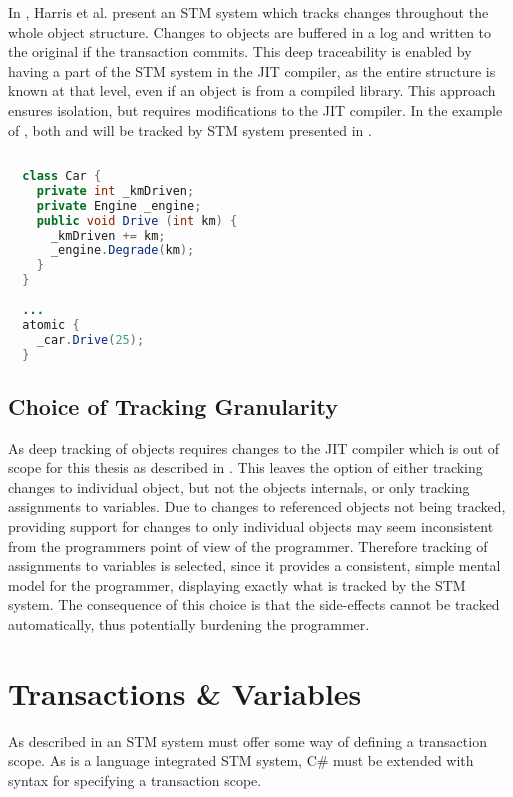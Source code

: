 In \cite{harris2003language}, Harris et al. present an \ac{STM} system which tracks changes throughout the whole object structure. Changes to objects are buffered in a log and written to the original if the transaction commits. This deep traceability is enabled by having a part of the \ac{STM} system in the \ac{JIT} compiler, as the entire structure is known at that level, even if an object is from a compiled library. This approach ensures isolation, but requires modifications to the \ac{JIT} compiler. In the example of , both  and  will be tracked by \ac{STM} system presented in \cite{harris2003language}.
%
\begin{lstlisting}[label=lst:tracking_object,
  float,
  caption={Tracking Changes to Object},
  language=Java,  
  showspaces=false,
  showtabs=false,
  breaklines=true,
  showstringspaces=false,
  breakatwhitespace=true,
  commentstyle=\color{greencomments},
  keywordstyle=\color{bluekeywords},
  stringstyle=\color{redstrings},
  morekeywords={atomic, retry, orElse, var, get, set}]  % Start your code-block
  
  class Car {
    private int _kmDriven;
    private Engine _engine;
    public void Drive (int km) { 
      _kmDriven += km; 
      _engine.Degrade(km);
    }
  }
  
  ...
  atomic {
    _car.Drive(25);
  }
\end{lstlisting}
%
\subsection{Choice of Tracking Granularity}
As deep tracking of objects requires changes to the \ac{JIT} compiler which is out of scope for this thesis as described in . This leaves the option of either tracking changes to individual object, but not the objects internals, or only tracking assignments to variables. Due to changes to referenced objects not being tracked, providing support for changes to only individual objects may seem inconsistent from the programmers point of view of the programmer. Therefore tracking of assignments to variables is selected, since it provides a consistent, simple mental model for the programmer, displaying exactly what is tracked by the \ac{STM} system. The consequence of this choice is that the side-effects cannot be tracked automatically, thus potentially burdening the programmer.

\section{Transactions \& Variables}
\label{subsec:rec_transactions_variables}
As described in  an \ac{STM} system must offer some way of defining a transaction scope. As \stmnamesp is a language integrated \ac{STM} system, C\# must be extended with syntax for specifying a transaction scope.

